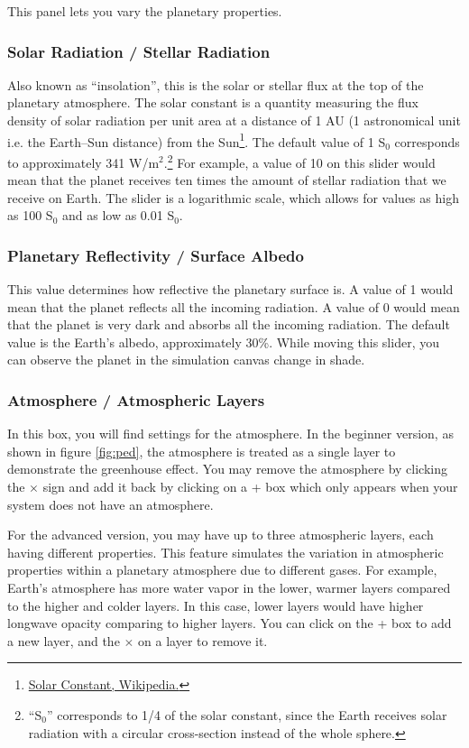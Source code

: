 \documentclass[a4paper,12pt]{article}
\begin{document}
This panel lets you vary the planetary properties.

\subsubsection*{Solar Radiation / Stellar Radiation}

Also known as ``insolation'', this is the solar or stellar flux at the top of the planetary atmosphere. The solar constant is a quantity measuring the flux density of solar radiation per unit area at a distance of 1 AU (1 astronomical unit i.e. the Earth--Sun distance) from the Sun\footnote{\href{https://en.wikipedia.org/wiki/Solar_constant}{Solar Constant, Wikipedia.}}. The default value of 1 S$_0$ corresponds to approximately 341 W/m$^2$.\footnote{``S$_0$'' corresponds to 1/4 of the solar constant, since the Earth receives solar radiation with a circular cross-section instead of the whole sphere.} For example, a value of 10 on this slider would mean that the planet receives ten times the amount of stellar radiation that we receive on Earth. The slider is a logarithmic scale, which allows for values as high as 100 S$_0$ and as low as 0.01 S$_0$. 


\subsubsection*{Planetary Reflectivity / Surface Albedo}

This value determines how reflective the planetary surface is. A value of 1 would mean that the planet reflects all the incoming radiation. A value of 0 would mean that the planet is very dark and absorbs all the incoming radiation. The default value is the Earth's albedo, approximately 30\%. While moving this slider, you can observe the planet in the simulation canvas change in shade.

\subsubsection*{Atmosphere / Atmospheric Layers}

In this box, you will find settings for the atmosphere. In the beginner version, as shown in figure \ref{fig:ped}, the atmosphere is treated as a single layer to demonstrate the greenhouse effect. You may remove the atmosphere by clicking the $\times$ sign and add it back by clicking on a + box which only appears when your system does not have an atmosphere.

For the advanced version, you may have up to three atmospheric layers, each having different properties. This feature simulates the variation in atmospheric properties within a planetary atmosphere due to different gases. For example, Earth's atmosphere has more water vapor in the lower, warmer layers compared to the higher and colder layers. In this case, lower layers would have higher longwave opacity comparing to higher layers. You can click on the + box to add a new layer, and the $\times$ on a layer to remove it. 
\end{document}
